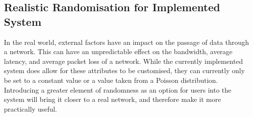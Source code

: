 \subsection{Realistic Randomisation for Implemented System}
In the real world, external factors have an impact on the passage of data through a network. This can have an unpredictable effect on the bandwidth, average latency, and average packet loss of a network. While the currently implemented system does allow for these attributes to be customised, they can currently only be set to a constant value or a value taken from a Poisson distribution. Introducing a greater element of randomness as an option for users into the system will bring it closer to a real network, and therefore make it more practically useful.

